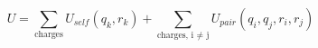 \begin{equation}
U = \sum_{\textrm{charges}}U_{self}(q_k,r_k) + \sum_{\textrm{charges, i $\ne$ j}}U_{pair}(q_i,q_j,r_i,r_j)
\end{equation}
